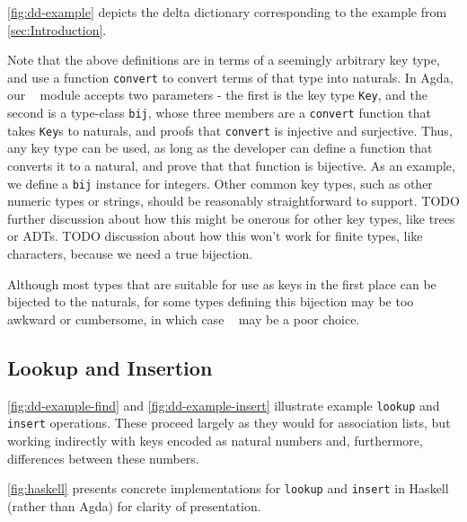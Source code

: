 \autoref{fig:dd-example} depicts the delta dictionary corresponding to the example from \autoref{sec:Introduction}.



Note that the above definitions are in terms of a seemingly arbitrary key type,
and use a function \texttt{convert} to convert terms of that type into naturals.
In Agda, our \dd~ module accepts two parameters - the first is the key type \texttt{Key},
and the second is a type-class \texttt{bij}, whose three members are a \texttt{convert}
function that takes \texttt{Key}s to naturals, and proofs that \texttt{convert} is
injective and surjective. Thus, any key type can be used, as long as the developer
can define a function that converts it to a natural, and prove that that function is
bijective. As an example, we define a \texttt{bij} instance for integers. Other common
key types, such as other numeric types or strings, should be reasonably straightforward
to support. TODO further discussion about how this might be onerous for other key types,
like trees or ADTs. TODO discussion about how this won't work for finite types, like
characters, because we need a true bijection.

Although most types that are suitable for use as keys in the first place can be bijected to the
naturals, for some types defining this bijection may be too awkward or cumbersome, in which case \dds~ may
be a poor choice.

\subsection{Lookup and Insertion}
\label{sec:DD:basics}



\autoref{fig:dd-example-find} and \autoref{fig:dd-example-insert} illustrate example \texttt{lookup} and \texttt{insert} operations.
%
These proceed largely as they would for association lists, but working indirectly with keys encoded as natural numbers and, furthermore, differences between these numbers.

\autoref{fig:haskell} presents concrete implementations for \texttt{lookup} and \texttt{insert} in Haskell (rather than Agda) for clarity of presentation.
%

